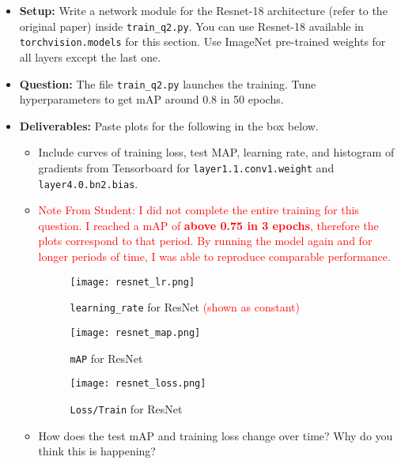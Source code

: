 \documentclass[11pt,addpoints,answers]{exam}
\numberwithin{equation}{section} %
\numberwithin{figure}{section} %
\numberwithin{table}{section} %
\newcommand{\red}[1]{\textcolor{red}{#1}}
\begin{document}
\begin{itemize}
    \item \textbf{Setup:} Write a network module for the Resnet-18 architecture (refer to the original paper) inside \texttt{train\_q2.py}. You can use Resnet-18 available in \texttt{torchvision.models} for this section. Use ImageNet pre-trained weights for all layers except the last one. 
    \item \textbf{Question:} The file \texttt{train\_q2.py} launches the training. Tune hyperparameters to get mAP around 0.8 in 50 epochs.
    \item \textbf{Deliverables:} Paste plots for the following in the box below.
    \begin{itemize}
        \item Include curves of training loss, test MAP, learning rate, and histogram of gradients from Tensorboard for \texttt{layer1.1.conv1.weight} and \texttt{layer4.0.bn2.bias}.
        \item \red{Note From Student: I did not complete the entire training for this question.
        I reached a mAP of \textbf{above 0.75 in 3 epochs}, therefore the plots correspond to that period.
        By running the model again and for longer periods of time, I was able to reproduce comparable performance.}
        
        \begin{figure}[H]
        \centering
        \texttt{[image: resnet\_lr.png]}
        \caption{\texttt{learning\_rate} for ResNet \red{(shown as constant)}}
        \label{fig:q2_learning_rate}
        \end{figure}
        
        \begin{figure}[H]
        \centering
        \texttt{[image: resnet\_map.png]}
        \caption{\texttt{mAP} for ResNet}
        \label{fig:q2_map}
        \end{figure}
        
        \begin{figure}[H]
        \centering
        \texttt{[image: resnet\_loss.png]}
        \caption{\texttt{Loss/Train} for ResNet}
        \label{fig:q2_training_loss}
        \end{figure}

        \item How does the test mAP and training loss change over time? Why do you think this is happening?


\end{itemize}
\end{itemize}
\end{document}
